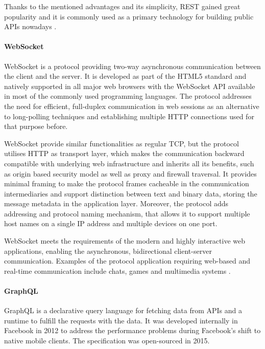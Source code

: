 Thanks to the mentioned advantages and its simplicity, REST gained great popularity and it is commonly used as a primary technology for building public APIs nowadays \cite{APIDesignInDistributedSystems}.

\paragraph{WebSocket}

WebSocket \cite{WebSocketRFC} is a protocol providing two-way asynchronous communication between the client and the server. It is developed as part of the HTML5 standard and natively supported in all major web browsers with the WebSocket API available in most of the commonly used programming languages. The protocol addresses the need for efficient, full-duplex communication in web sessions as an alternative to long-polling techniques and establishing multiple HTTP connections used for that purpose before.

WebSocket provide similar functionalities as regular TCP, but the protocol utilises HTTP as transport layer, which makes the communication backward compatible with underlying web infrastructure and inherits all its benefits, such as origin based security model as well as proxy and firewall traversal. It provides minimal framing to make the protocol frames cacheable in the communication intermediaries and support distinction between text and binary data, storing the message metadata in the application layer. Moreover, the protocol adds addressing and protocol naming mechanism, that allows it to support multiple host names on a single IP address and multiple devices on one port.

WebSocket meets the requirements of the modern and highly interactive web applications, enabling the asynchronous, bidirectional client-server communication. Examples of the protocol application requiring web-based and real-time communication include chats, games and multimedia systems \cite{PerfomranceEvaluationonWebsocketProtocol}.

\paragraph{GraphQL}

GraphQL \cite{GraphQL} is a declarative query language for fetching data from APIs and a runtime to fulfill the requests with the data. It was developed internally in Facebook in 2012 to address the performance problems during Facebook's shift to native mobile clients. The specification was open-sourced in 2015.

